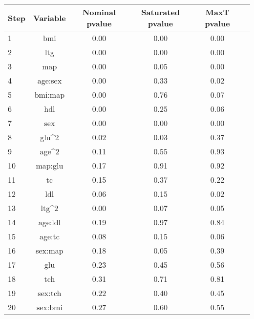 \begin{tabular}{|l|c|c|c|c|c|}
\hline
 Step & Variable &  Nominal pvalue &  Saturated pvalue &  MaxT pvalue \\
\hline
    1 &      bmi &            0.00 &              0.00 &         0.00 \\
    2 &      ltg &            0.00 &              0.00 &         0.00 \\
    3 &      map &            0.00 &              0.05 &         0.00 \\
    4 &  age:sex &            0.00 &              0.33 &         0.02 \\
    5 &  bmi:map &            0.00 &              0.76 &         0.07 \\
    6 &      hdl &            0.00 &              0.25 &         0.06 \\
    7 &      sex &            0.00 &              0.00 &         0.00 \\
    8 &    glu^2 &            0.02 &              0.03 &         0.37 \\
    9 &    age^2 &            0.11 &              0.55 &         0.93 \\
   10 &  map:glu &            0.17 &              0.91 &         0.92 \\
   11 &       tc &            0.15 &              0.37 &         0.22 \\
   12 &      ldl &            0.06 &              0.15 &         0.02 \\
   13 &    ltg^2 &            0.00 &              0.07 &         0.05 \\
   14 &  age:ldl &            0.19 &              0.97 &         0.84 \\
   15 &   age:tc &            0.08 &              0.15 &         0.06 \\
   16 &  sex:map &            0.18 &              0.05 &         0.39 \\
   17 &      glu &            0.23 &              0.45 &         0.56 \\
   18 &      tch &            0.31 &              0.71 &         0.81 \\
   19 &  sex:tch &            0.22 &              0.40 &         0.45 \\
   20 &  sex:bmi &            0.27 &              0.60 &         0.55 \\
\hline
\end{tabular}
